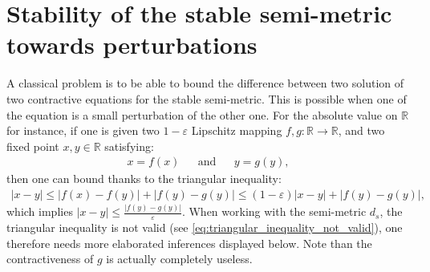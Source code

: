 \documentclass[a4papaer, titlepage]{book}
\begin{document}
\section{Stability of the stable semi-metric towards perturbations}

A classical problem is to be able to bound the difference between two solution of two contractive equations for the stable semi-metric. This is possible when one of the equation is a small perturbation of the other one. For the absolute value on $\mathbb R$ for instance, if one is given two $1-\varepsilon$ Lipschitz mapping $f,g: \mathbb R \to \mathbb R$, and two fixed point $x,y \in \mathbb R$ satisfying:
\begin{align*}
  x = f(x)&
  &\text{and}&
  &y = g(y),
\end{align*}
then one can bound thanks to the triangular inequality:
\begin{align}%
  |x - y| \leq |f(x) - f(y) |  + | f(y) - g(y)|\leq (1- \varepsilon) |x - y| + |f(y) - g(y)|,
\end{align}
which implies $|x - y | \leq \frac{ | f(y) - g(y)|}{\varepsilon}$. When working with the semi-metric $d_s$, the triangular inequality is not valid (see \eqref{eq:triangular_inequality_not_valid}), one therefore needs more elaborated inferences displayed below. Note than the contractiveness of $g$ is actually completely useless.
\end{document}
